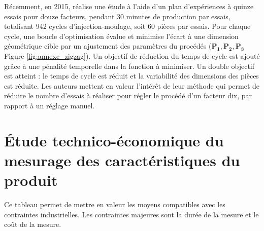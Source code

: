 Récemment, en 2015, \cite{johnston_-line_2015} réalise une étude à l'aide d'un plan d'expériences à quinze essais pour douze facteurs, pendant 30 minutes de production par essais, totalisant 942 cycles d'injection-moulage, soit 60 pièces par essais.
Pour chaque cycle, une boucle d'optimisation évalue et minimise l'écart à une dimension géométrique cible par un ajustement des paramètres du procédés ($\boldsymbol{P_1, P_2, P_3}$ Figure \ref{fig:annexe_zigzag}).
Un objectif de réduction du temps de cycle est ajouté grâce à une pénalité temporelle dans la fonction à minimiser.
Un double objectif est atteint : le temps de cycle est réduit et la variabilité des dimensions des pièces est réduite.
Les auteurs mettent en valeur l'intérêt de leur méthode qui permet de réduire le nombre d'essais à réaliser pour régler le procédé d'un facteur dix, par rapport à un réglage manuel.


\FloatBarrier
\begingroup
\clearpage%
\let\clearpage\relax%
\vspace*{-4cm}%
\chapter{\large Étude technico-économique du mesurage des caractéristiques du produit}%
\endgroup
\label{Ann:3}

\vspace{-1cm}
Ce tableau permet de mettre en valeur les moyens compatibles avec les contraintes industrielles.
Les contraintes majeures sont la durée de la mesure et le coût de la mesure.

